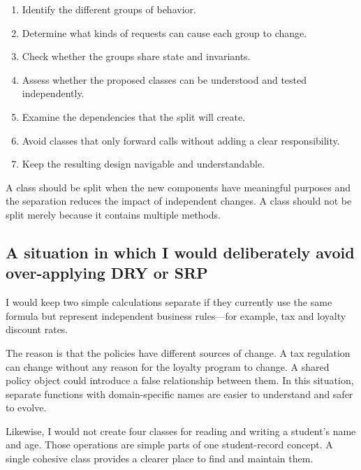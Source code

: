 \documentclass[12pt,a4paper]{article}
\begin{document}
\begin{enumerate}

\item Identify the different groups of behavior.

\item Determine what kinds of requests can cause each group to change.

\item Check whether the groups share state and invariants.

\item Assess whether the proposed classes can be understood and tested independently.

\item Examine the dependencies that the split will create.

\item Avoid classes that only forward calls without adding a clear responsibility.

\item Keep the resulting design navigable and understandable.

\end{enumerate}

A class should be split when the new components have meaningful purposes and the separation reduces the impact of independent changes. A class should not be split merely because it contains multiple methods.

\subsection{A situation in which I would deliberately avoid over-applying DRY or SRP}

I would keep two simple calculations separate if they currently use the same formula but represent independent business rules—for example, tax and loyalty discount rates.

The reason is that the policies have different sources of change. A tax regulation can change without any reason for the loyalty program to change. A shared policy object could introduce a false relationship between them. In this situation, separate functions with domain-specific names are easier to understand and safer to evolve.

Likewise, I would not create four classes for reading and writing a student's name and age. Those operations are simple parts of one student-record concept. A single cohesive class provides a clearer place to find and maintain them.
\end{document}
